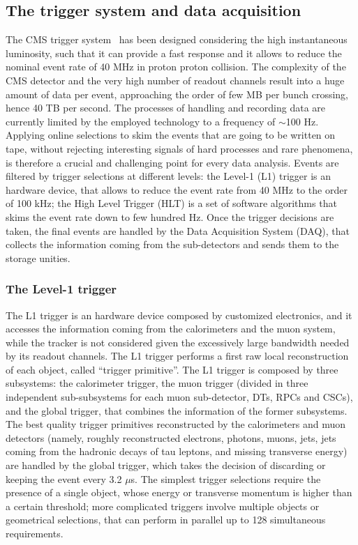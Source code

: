 \subsection{The trigger system and data acquisition}
The CMS trigger system~\cite{TRIG-TDR} has been designed considering the high instantaneous luminosity, such that it can provide a fast response and it allows to reduce the nominal event rate of 40 MHz in proton proton collision. The complexity of the CMS detector and the very high number of readout channels result into a huge amount of data per event, approaching the order of few MB per bunch crossing, hence 40 TB per second. The processes of handling and recording data are currently limited by the employed technology to a frequency of $\sim$100 Hz. Applying online selections to skim the events that are going to be written on tape, without rejecting interesting signals of hard processes and rare phenomena, is therefore a crucial and challenging point for every data analysis. Events are filtered by trigger selections at different levels: the Level-1 (L1) trigger is an hardware device, that allows to reduce the event rate from 40 MHz to the order of 100 kHz; the High Level Trigger (HLT) is a set of software algorithms that skims the event rate down to few hundred Hz. Once the trigger decisions are taken, the final events are handled by the Data Acquisition System (DAQ), that collects the information coming from the sub-detectors and sends them to the storage unities.

\subsubsection{The Level-1 trigger}
The L1 trigger is an hardware device composed by customized electronics, and it accesses the information coming from the calorimeters and the muon system, while the tracker is not considered given the excessively large bandwidth needed by its readout channels. The L1 trigger performs a first raw local reconstruction of each object, called ``trigger primitive''. The L1 trigger is composed by three subsystems: the calorimeter trigger, the muon trigger (divided in three independent sub-subsystems for each muon sub-detector, DTs, RPCs and CSCs), and the global trigger, that combines the information of the former subsystems. The best quality trigger primitives reconstructed by the calorimeters and muon detectors (namely, roughly reconstructed electrons, photons, muons, jets, jets coming from the hadronic decays of tau leptons, and missing transverse energy) are handled by the global trigger, which takes the decision of discarding or keeping the event every 3.2 $\mu$s. The simplest trigger selections require the presence of a single object, whose energy or transverse momentum is higher than a certain threshold; more complicated triggers involve multiple objects or geometrical selections, that can perform in parallel up to 128 simultaneous requirements.

